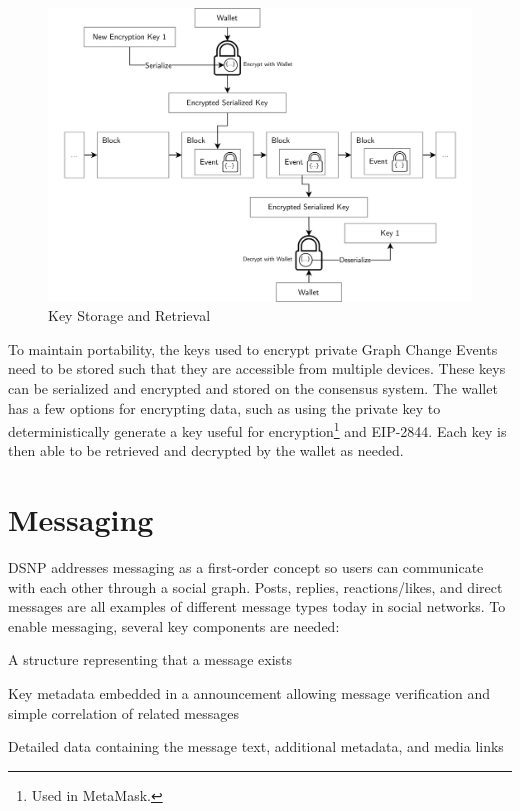 \documentclass[12pt,letterpaper]{article}
\providecommand{\tightlist}{%
\setlength{\itemsep}{0pt}\setlength{\parskip}{0pt}}
\begin{document}
\begin{figure}
	\includegraphics[width=\linewidth]{figures/Key Storage and Retrieval.png}
	\caption{Key Storage and Retrieval}
	\label{fig:4}
\end{figure}

To maintain portability, the keys used to encrypt private Graph Change Events need to be
stored such that they are accessible from multiple devices. These keys can be serialized and
encrypted and stored on the consensus system. The wallet has a few options for encrypting
data, such as using the private key to deterministically generate a key useful for
encryption\footnote{Used in MetaMask.\cite{metamask_doc}} and EIP-2844.\cite{eip2844} Each
key is then able to be retrieved and decrypted by the wallet as needed.

\section{Messaging}\label{sec:messaging}

DSNP addresses messaging as a first-order concept so users can communicate with each other
through a social graph. Posts, replies, reactions/likes, and direct messages are all
examples of different message types today in social networks. To enable messaging, several
key components are needed:

\begin{samepage}
	\begin{description}
		\tightlist
		\item[Announcement:]
		      A structure representing that a message exists
		\item[Announcement Metadata:]
		      Key metadata embedded in a announcement allowing
		      message verification and simple correlation of related messages
		\item[Content:]
		      Detailed data containing the message text, additional metadata, and media links
	\end{description}
\end{samepage}
\end{document}

